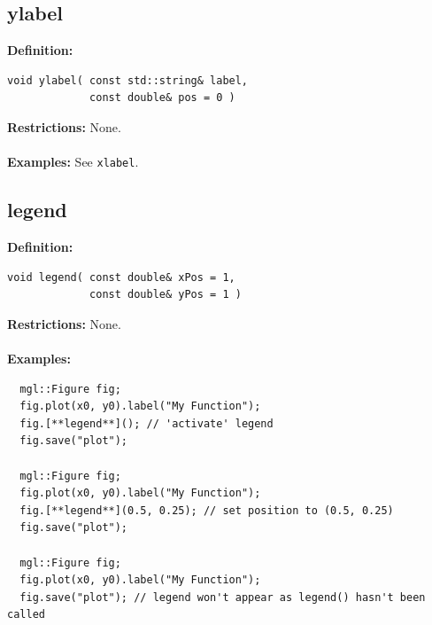\documentclass[a4paper]{article}
\newcommand{\command}[1]{\subsection{#1}}
\begin{document}
\command{ylabel}

\textbf{Definition:}
\begin{lstlisting}
void ylabel( const std::string& label, 
             const double& pos = 0 )
\end{lstlisting}
%
\textbf{Restrictions:} None. \\ \\
%
\textbf{Examples:} See \texttt{xlabel}.

\newpage
\command{legend}

\textbf{Definition:}
\begin{lstlisting}
void legend( const double& xPos = 1, 
             const double& yPos = 1 )
\end{lstlisting}
%
\textbf{Restrictions:} None.  \\ \\
%
\textbf{Examples:}
\begin{lstlisting}
  mgl::Figure fig;
  fig.plot(x0, y0).label("My Function");
  fig.[**legend**](); // 'activate' legend 
  fig.save("plot");
 
  mgl::Figure fig;
  fig.plot(x0, y0).label("My Function");
  fig.[**legend**](0.5, 0.25); // set position to (0.5, 0.25)
  fig.save("plot");

  mgl::Figure fig;
  fig.plot(x0, y0).label("My Function");
  fig.save("plot"); // legend won't appear as legend() hasn't been called
\end{lstlisting}
\end{document}
